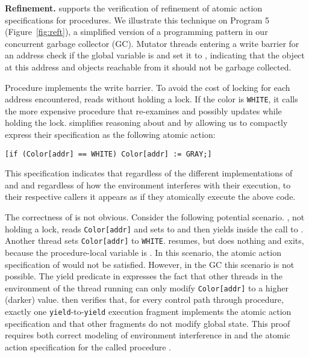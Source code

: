 {\bf Refinement.} 
\civl supports the verification of refinement of atomic action specifications for procedures. 
We illustrate this technique on Program 5 (Figure~\ref{fig:reft}),
a simplified version of a programming pattern in our concurrent garbage collector (GC).
Mutator threads entering a write barrier for an address  check
if the global variable  is 
and set it to , indicating that the object at this address
and objects reachable from it should not be garbage collected. 

Procedure  implements the write barrier.
To avoid the cost of locking for each address encountered,  reads  without holding a lock.
If the color is {\tt WHITE}, it calls the more expensive procedure  
that re-examines and possibly updates  while holding the lock.
\civl simplifies reasoning about  and  by allowing us to 
compactly express their specification as the following atomic action:
\begin{verbatim}
[if (Color[addr] == WHITE) Color[addr] := GRAY;]
\end{verbatim}
This specification indicates that regardless of the different implementations of 
 and  and regardless of how the environment interferes
with their execution, to their respective callers it appears as if they atomically execute the above code.

The correctness of  is not obvious.
Consider the following potential scenario. 
, not holding a lock, reads {\tt Color[addr]} and
sets  to  and then yields inside the call to
. Another thread sets {\tt Color[addr]} to
{\tt WHITE}.  resumes, but does nothing and exits,
because the procedure-local variable  is . In this scenario, the atomic action
specification of  would not be satisfied. However, in the GC this
scenario is not possible. 
The yield predicate in  expresses the fact that
other threads in the environment of the thread running  can
only modify {\tt Color[addr]} to a higher (darker) value. 
\civl then verifies that, for every control path through 
procedure, exactly one {\tt yield}-to-{\tt yield} execution
fragment implements the atomic action specification and that other fragments do not modify
global state. 
This proof requires both correct modeling of environment interference in 
and the atomic action specification for the called procedure .

